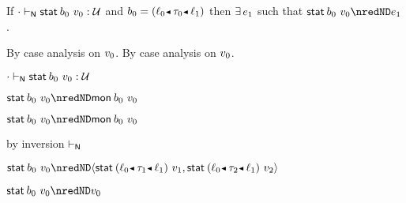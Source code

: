 \begin{lemma}\label{H-sta-type-progress}
  If\/ ${\cdot} \vdash_{\mathsf{N}} \mathsf{stat}^{}\,b_0~v_0 : {\mathcal U}$
  and\/ $\sbnd_0 \eeq \obnd{\sowner_0}{\stype_0}{\sowner_1}$
  then\/ $\exists\,e_1$
  such that\/ $\estab{\sbnd_0}{\svalue_0} \nredND \sexpr_1$.
\end{lemma}{
  \newcommand{\shortproof}{By case analysis on $\svalue_0$.}
\begin{lamportproof*}
  \shortproof
\mainproof
  \shortproof

    \begin{pfproof}
      \absurdstep
        \begin{pfproof}
          ${\cdot} \vdash_{\mathsf{N}} \mathsf{stat}^{}\,b_0~v_0 : {\mathcal U}$
        \end{pfproof}
    \end{pfproof}

    \begin{pfproof}
      \qedstep
        \begin{pfproof}
          $\estab{\sbnd_0}{\svalue_0} \nredND \emon{\sbnd_0}{\svalue_0}$
        \end{pfproof}
    \end{pfproof}

    \begin{pfproof}
      \qedstep
        \begin{pfproof}
          $\estab{\sbnd_0}{\svalue_0} \nredND \emon{\sbnd_0}{\svalue_0}$
        \end{pfproof}
    \end{pfproof}

    \begin{pfproof}
        \begin{pfproof}
          by inversion $\vdash_{\mathsf{N}}$
        \end{pfproof}
      \qedstep
        \begin{pfproof}
          $\estab{\sbnd_0}{\svalue_0} \nredND \epair{\estab{\obnd{\sowner_0}{\stype_1}{\sowner_1}}{\svalue_1}}{\estab{\obnd{\sowner_0}{\stype_2}{\sowner_1}}{\svalue_2}}$
        \end{pfproof}
    \end{pfproof}

    \begin{pfproof}
      \qedstep
        \begin{pfproof}
          $\estab{\sbnd_0}{\svalue_0} \nredND \svalue_0$
        \end{pfproof}
    \end{pfproof}

\end{lamportproof*}}

